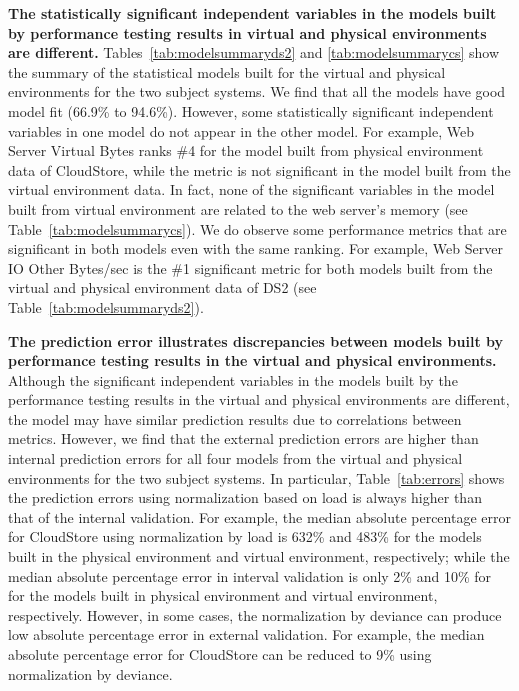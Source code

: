 \noindent \textbf{The statistically significant independent variables in the models built by performance testing results in virtual and physical environments are different.} Tables~\ref{tab:modelsummaryds2} and \ref{tab:modelsummarycs} show the summary of the statistical models built for the virtual and physical environments for the two subject systems. We find that all the models have good model fit (66.9\% to 94.6\%). However, some statistically significant independent variables in one model do not appear in the other model. For example, Web Server Virtual Bytes ranks \#4 for the model built from physical environment data of CloudStore, while the metric is not significant in the model built from the virtual environment data. In fact, none of the significant variables in the model built from virtual environment are related to the web server's memory (see Table~\ref{tab:modelsummarycs}). We do observe some performance metrics that are significant in both models even with the same ranking. For example, Web Server IO Other Bytes/sec is the \#1 significant metric for both models built from the virtual and physical environment data of DS2 (see Table~\ref{tab:modelsummaryds2}). 

\noindent \textbf{The prediction error illustrates discrepancies between models built by performance testing results in the virtual and physical environments.} Although the significant independent variables in the models built by the performance testing results in the virtual and physical environments are different, the model may have similar prediction results due to correlations between metrics. However, we find that the external prediction errors are higher than internal prediction errors for all four models from the virtual and physical environments for the two subject systems. In particular, Table~\ref{tab:errors} shows the prediction errors using normalization based on load is always higher than that of the internal validation. For example, the median absolute percentage error for CloudStore using normalization by load is 632\% and 483\% for the models built in the physical environment and virtual environment, respectively; while the median absolute percentage error in interval validation is only 2\% and 10\% for for the models built in physical environment and virtual environment, respectively. However, in some cases, the normalization by deviance can produce low absolute percentage error in external validation. For example, the median absolute percentage error for CloudStore can be reduced to 9\% using normalization by deviance. 

